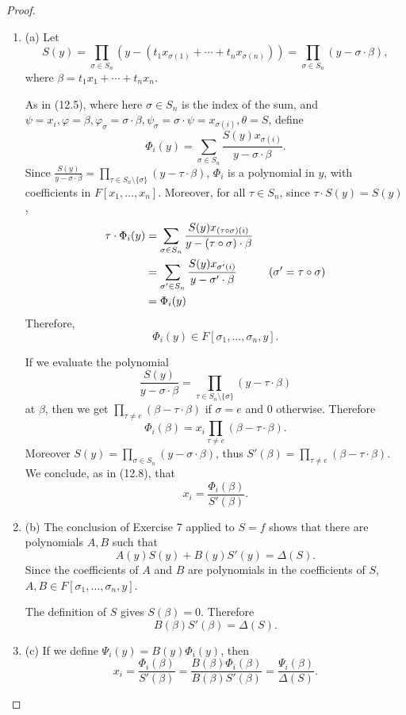 \documentclass[11pt,a4paper]{article}
\newcommand{\be} {\begin{enumerate}}
\newcommand{\ee} {\end{enumerate}}
\begin{document}
\begin{proof}
\be
\item[(a)]
Let 
$$S(y) = \prod_{\sigma \in S_n} \left ( y - (t_1x_{\sigma(1)} + \cdots + t_n x_{\sigma(n)}) \right) = \prod_{\sigma \in S_n} ( y - \sigma \cdot \beta),$$
where $\beta = t_1 x_1+ \cdots + t_n x_n$.

As in (12.5), where here $\sigma \in S_n$ is the index of the sum,  and $\psi = x_i, \varphi =  \beta, \varphi_\sigma = \sigma \cdot \beta, \psi_\sigma= \sigma \cdot \psi = x_{\sigma(i)}, \theta = S$, define 
$$\Phi_i(y) = \sum_{\sigma \in S_n} \frac{S(y) x_{\sigma(i)}}{y - \sigma \cdot \beta}.$$
Since $\frac{S(y)}{y-\sigma \cdot \beta} = \prod\limits_{\tau \in S_n\setminus \{\sigma\}} (y - \tau \cdot \beta)$, $\Phi_i$ is a polynomial in $y$, with coefficients in $F[x_1,\ldots,x_n]$. Moreover, for all $\tau \in S_n$, since $\tau \cdot S(y) = S(y)$,
\begin{align*}
\tau \cdot \Phi_i(y) &= \sum_{\sigma \in S_n} \frac {S(y) x_{(\tau \circ \sigma)(i)}}{y - (\tau \circ \sigma) \cdot \beta}\\
&= \sum_{\sigma' \in S_n} \frac{S(y) x_{\sigma'(i)}}{y - \sigma' \cdot \beta}\hspace{1.cm} (\sigma' = \tau \circ \sigma)\\
&= \Phi_i(y)
\end{align*}
Therefore,
$$\Phi_i(y) \in F[\sigma_1,\ldots,\sigma_n,y].$$

If we evaluate the polynomial
$$\frac{S(y)}{y-\sigma \cdot \beta} = \prod\limits_{\tau \in S_n\setminus \{\sigma\}} (y - \tau \cdot \beta)$$
at $\beta$, then we get $\prod_{\tau \ne e} (\beta - \tau \cdot \beta)$ if $\sigma = e$ and $0$ otherwise. Therefore
$$\Phi_i(\beta) = x_i \prod_{\tau \ne e} (\beta - \tau\cdot \beta).$$
Moreover $S(y) = \prod_{\sigma \in S_n} ( y - \sigma \cdot \beta)$, thus $S'(\beta) = \prod_{\tau \ne e} (\beta - \tau\cdot \beta)$. We conclude, as in (12.8), that
$$x_i = \frac{\Phi_i(\beta)}{S'(\beta)}.$$

\item[(b)] The conclusion of Exercise 7 applied to $S = f$ shows that there are polynomials $A,B$ such that
$$A(y) S(y) + B(y) S'(y) = \Delta(S).$$
Since the coefficients of $A$ and $B$ are polynomials in the coefficients of $S$, $A,B \in F[\sigma_1,\ldots,\sigma_n,y]$.

The definition of $S$ gives $S(\beta) = 0$. Therefore
$$B(\beta) S'(\beta) = \Delta(S).$$

\item[(c)] If we define $\Psi_i(y) = B(y) \Phi_i(y)$, then $$x_i = \frac{\Phi_i(\beta)}{S'(\beta)} = \frac{B(\beta) \Phi_i(\beta)}{B(\beta) S'(\beta)}  = \frac{\Psi_i(\beta)}{\Delta(S)}. $$
\ee
\end{proof}
\end{document}
